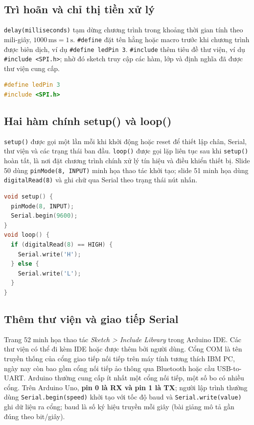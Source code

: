 \subsection{Trì hoãn và chỉ thị tiền xử lý}
\texttt{delay(milliseconds)} tạm dừng chương trình trong khoảng thời gian tính theo mili-giây, \(1000\,\mathrm{ms}=1\,\mathrm{s}\). \texttt{\#define} đặt tên hằng hoặc macro trước khi chương trình được biên dịch, ví dụ \texttt{\#define ledPin 3}. \texttt{\#include} thêm tiêu đề thư viện, ví dụ \texttt{\#include <SPI.h>}; nhờ đó sketch truy cập các hàm, lớp và định nghĩa đã được thư viện cung cấp.
\begin{lstlisting}[language=C++]
#define ledPin 3
#include <SPI.h>
\end{lstlisting}
\subsection{Hai hàm chính setup() và loop()}
\texttt{setup()} được gọi một lần mỗi khi khởi động hoặc reset để thiết lập chân, Serial, thư viện và các trạng thái ban đầu. \texttt{loop()} được gọi lặp liên tục sau khi \texttt{setup()} hoàn tất, là nơi đặt chương trình chính xử lý tín hiệu và điều khiển thiết bị. Slide 50 dùng \texttt{pinMode(8, INPUT)} minh họa thao tác khởi tạo; slide 51 minh họa dùng \texttt{digitalRead(8)} và ghi chữ qua Serial theo trạng thái nút nhấn.
\begin{lstlisting}[language=C++]
void setup() {
  pinMode(8, INPUT);
  Serial.begin(9600);
}
void loop() {
  if (digitalRead(8) == HIGH) {
    Serial.write('H');
  } else {
    Serial.write('L');
  }
}
\end{lstlisting}
\subsection{Thêm thư viện và giao tiếp Serial}
Trang 52 minh họa thao tác \emph{Sketch > Include Library} trong Arduino IDE. Các thư viện có thể đi kèm IDE hoặc được thêm bởi người dùng. Cổng COM là tên truyền thống của cổng giao tiếp nối tiếp trên máy tính tương thích IBM PC, ngày nay còn bao gồm cổng nối tiếp ảo thông qua Bluetooth hoặc cầu USB-to-UART. Arduino thường cung cấp ít nhất một cổng nối tiếp, một số bo có nhiều cổng. Trên Arduino Uno, \textbf{pin 0 là RX và pin 1 là TX}; người lập trình thường dùng \texttt{Serial.begin(speed)} khởi tạo với tốc độ baud và \texttt{Serial.write(value)} ghi dữ liệu ra cổng; baud là số ký hiệu truyền mỗi giây (bài giảng mô tả gần đúng theo bit/giây).
